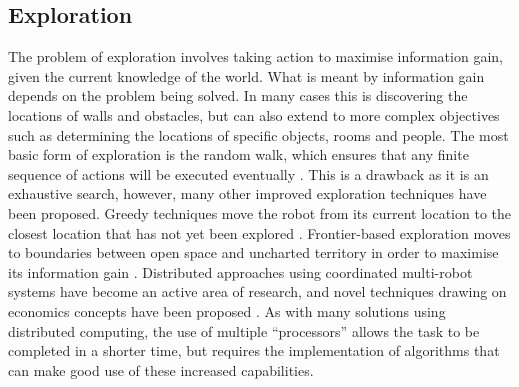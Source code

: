 \documentclass[conference]{IEEEtran}
\begin{document}
\subsection{Exploration}
The problem of exploration involves taking action to maximise information gain, given the current knowledge of the world. What is meant by information gain depends on the problem being solved. In many cases this is discovering the locations of walls and obstacles, but can also extend to more complex objectives such as determining the locations of specific objects, rooms and people. The most basic form of exploration is the random walk, which ensures that any finite sequence of actions will be executed eventually \cite{thrunexploration}. This is a drawback as it is an exhaustive search, however, many other improved exploration techniques have been proposed. Greedy techniques move the robot from its current location to the closest location that has not yet been explored \cite{greedy}. Frontier-based exploration moves to boundaries between open space and uncharted territory in order to maximise its information gain \cite{frontier}. Distributed approaches using coordinated multi-robot systems have become an active area of research, and novel techniques drawing on economics concepts have been proposed \cite{multiexp, marketexp}. As with many solutions using distributed computing, the use of multiple ``processors'' allows the task to be completed in a shorter time, but requires the implementation of algorithms that can make good use of these increased capabilities.
\end{document}
